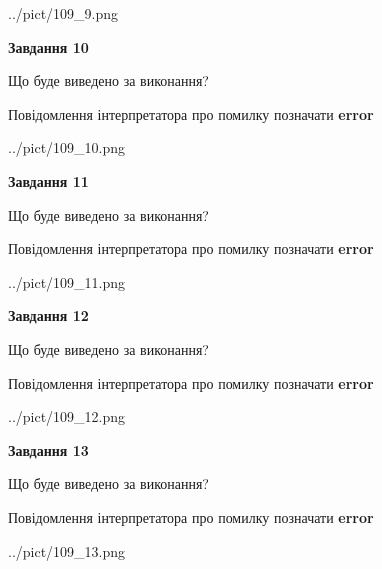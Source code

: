 \documentclass[11pt, ukrainian]{article}
\begin{document}
{\begin {large}
\begin{center}
	{../pict/109_9.png}
\end{center}
\newpage

{\begin {center}\textbf{Завдання 10}\end {center}}\par
Що буде виведено за виконання? \par
Повідомлення інтерпретатора про помилку позначати \textbf{error}

\begin{center}
	{../pict/109_10.png}
\end{center}
\newpage

{\begin {center}\textbf{Завдання 11}\end {center}}\par
Що буде виведено за виконання? \par
Повідомлення інтерпретатора про помилку позначати \textbf{error}

\begin{center}
	{../pict/109_11.png}
\end{center}
\newpage

{\begin {center}\textbf{Завдання 12}\end {center}}\par
Що буде виведено за виконання? \par
Повідомлення інтерпретатора про помилку позначати \textbf{error}

\begin{center}
	{../pict/109_12.png}
\end{center}
\newpage

{\begin {center}\textbf{Завдання 13}\end {center}}\par
Що буде виведено за виконання? \par
Повідомлення інтерпретатора про помилку позначати \textbf{error}

\begin{center}
	{../pict/109_13.png}
\end{center}
\newpage


\end{large}}
\end{document}
